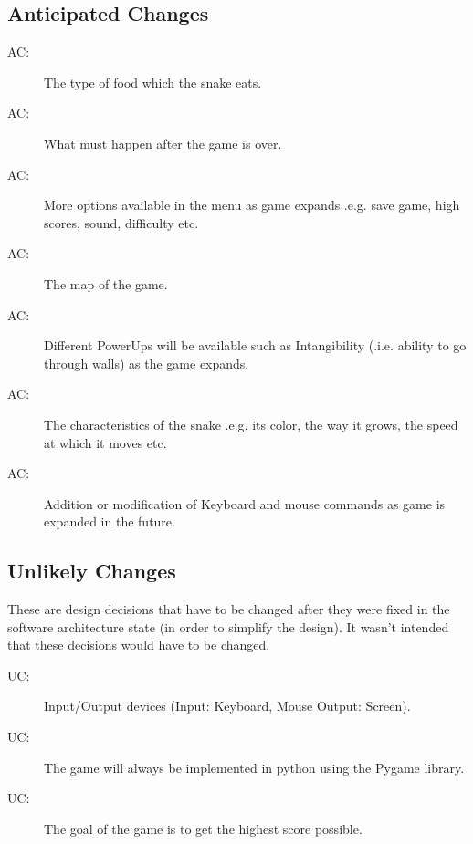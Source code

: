 \documentclass[12pt]{article}
\newcounter{acnum}
\newcommand{\actheacnum}{AC\theacnum}
\newcounter{ucnum}
\newcommand{\uctheucnum}{UC\theucnum}
\begin{document}
\subsection{Anticipated Changes} \label{SecAchange}



\begin{description}
\item[ \actheacnum \label{acFood}:] The type of food which the snake eats.
\item[ \actheacnum \label{acGameOver}:] What must happen after the game is over.
\item[ \actheacnum \label{acMainMenu}:] More options available in the menu as game expands .e.g. save game, high scores, sound, difficulty etc.
\item[ \actheacnum \label{acPlayMap}:] The map of the game.
\item[ \actheacnum \label{acPowerUps}:] Different PowerUps will be available such as Intangibility (.i.e. ability to go through walls) as the game expands.
\item[ \actheacnum \label{acSnake}:] The characteristics of the snake .e.g. its color, the way it grows, the speed at which it moves etc.
\item[ \actheacnum \label{acInput}:] Addition or modification of Keyboard and mouse commands as game is expanded in the future.
\end{description}

\subsection{Unlikely Changes} \label{SecUchange}

These are design decisions that have to be changed after they were fixed in the software architecture state (in order to simplify the design). It wasn't intended that these decisions would have to be changed.

\begin{description}
\item[ \uctheucnum \label{ucIO}:] Input/Output devices
  (Input: Keyboard, Mouse Output: Screen).
\item[ \uctheucnum \label{ucPygame}:] The game will always be implemented in python using the Pygame library.
\item[ \uctheucnum \label{ucGoal}:] The goal of the game is to get the highest score possible.
\end{description}
\end{document}

